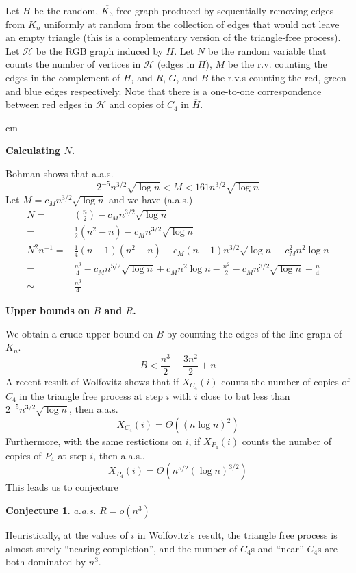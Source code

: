 \documentclass{article}
\newtheorem{conjecture}{Conjecture}
\begin{document}
Let $H$ be the random, $\overline{K_3}$-free graph produced by sequentially removing edges from $K_n$ uniformly at random from the collection of edges that would not leave an empty triangle (this is a complementary version of the triangle-free process).  Let $\mathcal{H}$ be the RGB graph induced by $H$.  Let $N$ be the random variable that counts the number of vertices in $\mathcal{H}$ (edges in $H$), $M$ be the r.v. counting the edges in the complement of $H$, and $R$, $G$, and $B$ the r.v.s counting the red, green and blue edges respectively.  Note that there is a one-to-one correspondence between red edges in $\mathcal{H}$ and copies of $C_4$ in $\overline{H}$.

 cm
 
\noindent\textbf{Calculating $N$.}

Bohman shows that a.a.s. \[2^{-5}n^{3/2}\sqrt{\log n} < M < 161n^{3/2}\sqrt{\log n}  \] Let $M = c_Mn^{3/2}\sqrt{\log n} $ and we have (a.a.s.)
\begin{eqnarray}
	N =& {n\choose 2} - c_Mn^{3/2}\sqrt{\log n}\\
	   =& \frac{1}{2}(n^2-n) - c_Mn^{3/2}\sqrt{\log n}\\
	N^2n^{-1} =& \frac{1}{4}(n-1)(n^2-n) -c_M(n-1)n^{3/2}\sqrt{\log n} + c_M^2n^{2}\log n \\
	=&\displaystyle \frac{n^3}{4}-c_Mn^{5/2}\sqrt{\log n} + c_Mn^2\log n-\frac{n^2}{2} - c_Mn^{3/2}\sqrt{\log n} + \frac{n}{4}\\
	\sim & \displaystyle\frac{n^3}{4}
\end{eqnarray}

\noindent\textbf{Upper bounds on $B$ and $R$.}

We obtain a crude upper bound on $B$ by counting the edges of the line graph of $K_n$.
\begin{equation}
	B < \frac{n^3}{2} - \frac{3n^2}{2} + n
\end{equation}
A recent result of Wolfovitz shows that if $X_{C_4}(i)$ counts the number of copies of $C_4$ in the triangle free process at step $i$ with $i$ close to but less than $2^{-5}n^{3/2}\sqrt{\log n}$, then a.a.s.
\[X_{C_4}(i) = \Theta((n\log n)^2)\] Furthermore, with the same restictions on $i$, if $X_{P_4}(i)$ counts the number of copies of $P_4$ at step $i$, then a.a.s..
\[X_{P_4}(i) = \Theta(n^{5/2}(\log n)^{3/2})\]This leads us to conjecture 
\begin{conjecture}
	a.a.s. $R = o(n^3)$
\end{conjecture} 
Heuristically, at the values of $i$ in Wolfovitz's result, the triangle free process is almost surely ``nearing completion'', and the number of $C_4$s and ``near'' $C_4$s are both dominated by $n^3$.
\end{document}
